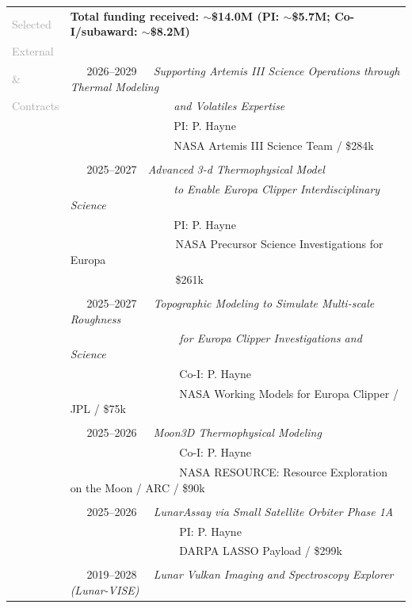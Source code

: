 \documentclass[letterpaper,10pt,twoside]{article}
\begin{document}
\begin{tabular}{@{} l l}
 \large{\textcolor{darkgray}{Selected}} & \textbf{Total funding received: {$\sim$}\$14.0M (PI: {$\sim$}\$5.7M; Co-I/subaward: {$\sim$}\$8.2M)} \\
 \large{\textcolor{darkgray}{External}} & \\
 \large{\textcolor{darkgray}{\&}} & ~~~2026--2029~~~\textit{Supporting Artemis III Science Operations through Thermal Modeling} \\
 \large{\textcolor{darkgray}{Contracts}} & ~~~~~~~~~~~~~~~~~~ \textit{and Volatiles Expertise} \\
 & ~~~~~~~~~~~~~~~~~~ PI: P. Hayne \\
 & ~~~~~~~~~~~~~~~~~~ NASA Artemis III Science Team / \$284k \\
 & \\
 & ~~~2025--2027~~\textit{Advanced 3-d Thermophysical Model} \\
 & ~~~~~~~~~~~~~~~~~~ \textit{to Enable Europa Clipper Interdisciplinary Science}~~~\\
 & ~~~~~~~~~~~~~~~~~~ PI: P. Hayne  \\
 & ~~~~~~~~~~~~~~~~~~~NASA Precursor Science Investigations for Europa \\
 & ~~~~~~~~~~~~~~~~~~~\$261k \\
 & \\
 & ~~~2025--2027~~~\textit{Topographic Modeling to Simulate Multi-scale Roughness} \\
 & ~~~~~~~~~~~~~~~~ ~~~\textit{for Europa Clipper Investigations and Science} \\
 & ~~~~~~~~~~~~~~~~ ~~~Co-I: P. Hayne \\
 & ~~~~~~~~~~~~~~~~ ~~~NASA Working Models for Europa Clipper / JPL / \$75k \\
 & \\
 & ~~~2025--2026~~~\textit{Moon3D Thermophysical Modeling} \\
 & ~~~~~~~~~~~~~~~~ ~~~Co-I: P. Hayne \\
 & ~~~~~~~~~~~~~~~~ ~~~NASA RESOURCE: Resource Exploration on the Moon / ARC / \$90k \\
 & \\
 & ~~~2025--2026~~~\textit{LunarAssay via Small Satellite Orbiter Phase 1A} \\
 & ~~~~~~~~~~~~~~~~ ~~~PI: P. Hayne \\
 & ~~~~~~~~~~~~~~~~ ~~~DARPA LASSO Payload / \$299k \\
 & \\
 & ~~~2019--2028~~~\textit{Lunar Vulkan Imaging and Spectroscopy Explorer (Lunar-VISE)} \\

\end{tabular}
\end{document}
